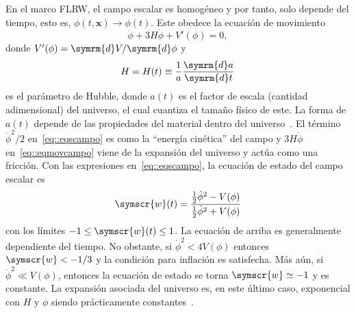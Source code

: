 En el marco FLRW, el campo escalar es homogéneo y por tanto, solo depende del tiempo, esto es, \(\phi\left(t,\symbf{x}\right)\rightarrow\phi(t)\). Este obedece la ecuación de movimiento
\begin{equation}
    \ddot{\phi}+3H\dot{\phi}+V'(\phi)=0,\label{eq::eqmovcampo}
\end{equation}
donde \(V'(\phi)=\symrm{d}V/\symrm{d}\phi\) y
\begin{equation}
    H=H(t)\equiv \frac{1}{a}\frac{\symrm{d}a}{\symrm{d}t}
\end{equation}
es el parámetro de Hubble, donde \(a(t)\) es el factor de escala (cantidad adimensional) del universo, el cual cuantiza el tamaño físico de este. La forma de \(a(t)\) depende de las propiedades del material dentro del universo~\cite{liddle1998introduction}. El término \(\dot{\phi}^2/2\) en~\eqref{eq::eqscampo} es como la ``energía cinética'' del campo y \(3H\dot{\phi}\) en~\eqref{eq::eqmovcampo} viene de la expansión del universo y actúa como una fricción. Con las expresiones en~\eqref{eq::eqscampo}, la ecuación de estado del campo escalar es
\begin{equation}
    \symscr{w}(t)=\frac{\frac{1}{2}\dot{\phi}^2-V(\phi)}{\frac{1}{2}\dot{\phi}^2+V(\phi)}\label{eq::estado}
\end{equation}
con los límites \(-1\leq\symscr{w}(t)\leq 1\). La ecuación de arriba es generalmente dependiente del tiempo. No obstante, si \(\dot{\phi}^2<4V(\phi)\) entonces \(\symscr{w} < -1/3\) y la condición para inflación es satisfecha. Más aún, si \(\dot{\phi}^2 \ll V(\phi)\), entonces la ecuación de estado se torna \(\symscr{w}\simeq -1\) y es constante. La expansión asociada del universo es, en este último caso, exponencial con \(H\) y \(\phi\) siendo prácticamente constantes~\cite{knobel2012introduction}.
